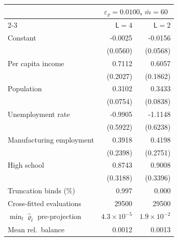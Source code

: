 \begin{tabular}{lrr}
\toprule
 & \multicolumn{2}{c}{$\varepsilon_\varrho = 0.0100$, $\bar m = 60$} \\
\cmidrule(lr){2-3}
 & $\mathsf L = 4$ & $\mathsf L = 2$ \\
\midrule
Constant & -0.0025 & -0.0156 \\
 & (0.0560) & (0.0568) \\
Per capita income & 0.7112 & 0.6057 \\
 & (0.2027) & (0.1862) \\
Population & 0.3102 & 0.3433 \\
 & (0.0754) & (0.0838) \\
Unemployment rate & -0.9905 & -1.1148 \\
 & (0.5922) & (0.6238) \\
Manufacturing employment & 0.3918 & 0.4198 \\
 & (0.2398) & (0.2751) \\
High school & 0.8743 & 0.9008 \\
 & (0.3188) & (0.3396) \\
\midrule
Truncation binds (\%) & 0.997 & 0.000 \\
Cross-fitted evaluations & 29500 & 29500 \\
$\min_l\hat\varrho_l$ pre-projection & $4.3 \times 10^{-5}$ & $1.9 \times 10^{-2}$ \\
Mean rel.\ balance & 0.0012 & 0.0013 \\
\bottomrule
\end{tabular}
